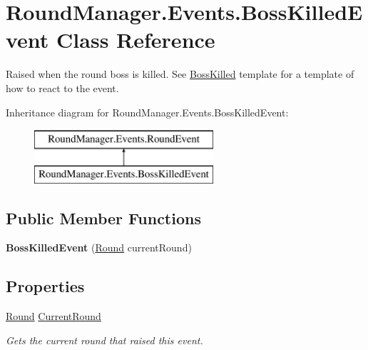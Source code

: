 \hypertarget{class_round_manager_1_1_events_1_1_boss_killed_event}{}\section{Round\+Manager.\+Events.\+Boss\+Killed\+Event Class Reference}
\label{class_round_manager_1_1_events_1_1_boss_killed_event}


Raised when the round boss is killed. See \hyperlink{class_round_manager_1_1_boss_killed}{Boss\+Killed} template for a template of how to react to the event.  


Inheritance diagram for Round\+Manager.\+Events.\+Boss\+Killed\+Event\+:\begin{figure}[H]
\begin{center}
\leavevmode
\includegraphics[height=2.000000cm]{class_round_manager_1_1_events_1_1_boss_killed_event}
\end{center}
\end{figure}
\subsection*{Public Member Functions}
\begin{DoxyCompactItemize}
\item 
\hypertarget{class_round_manager_1_1_events_1_1_boss_killed_event_a6ee1787e217f3cec33d64dc44d2cb147}{}{\bfseries Boss\+Killed\+Event} (\hyperlink{class_round_manager_1_1_round}{Round} current\+Round)\label{class_round_manager_1_1_events_1_1_boss_killed_event_a6ee1787e217f3cec33d64dc44d2cb147}

\end{DoxyCompactItemize}
\subsection*{Properties}
\begin{DoxyCompactItemize}
\item 
\hyperlink{class_round_manager_1_1_round}{Round} \hyperlink{class_round_manager_1_1_events_1_1_boss_killed_event_a3e2a14ff61eceb7c3b1d9ffc8c0867c6}{Current\+Round}
\begin{DoxyCompactList}\small\item\em Gets the current round that raised this event. \end{DoxyCompactList}\end{DoxyCompactItemize}


